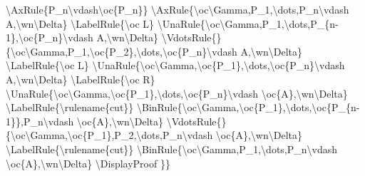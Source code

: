\textbackslash{}AxRule\{P\_n\textbackslash{}vdash\textbackslash{}oc\{P\_n\}\}
\textbackslash{}AxRule\{\textbackslash{}oc\textbackslash{}Gamma,P\_1,\textbackslash{}dots,P\_n\textbackslash{}vdash
A,\textbackslash{}wn\textbackslash{}Delta\}
\textbackslash{}LabelRule\{\textbackslash{}oc L\}
\textbackslash{}UnaRule\{\textbackslash{}oc\textbackslash{}Gamma,P\_1,\textbackslash{}dots,P\_\{n-1\},\textbackslash{}oc\{P\_n\}\textbackslash{}vdash
A,\textbackslash{}wn\textbackslash{}Delta\}
\textbackslash{}VdotsRule\{\}\{\textbackslash{}oc\textbackslash{}Gamma,P\_1,\textbackslash{}oc\{P\_2\},\textbackslash{}dots,\textbackslash{}oc\{P\_n\}\textbackslash{}vdash
A,\textbackslash{}wn\textbackslash{}Delta\}
\textbackslash{}LabelRule\{\textbackslash{}oc L\}
\textbackslash{}UnaRule\{\textbackslash{}oc\textbackslash{}Gamma,\textbackslash{}oc\{P\_1\},\textbackslash{}dots,\textbackslash{}oc\{P\_n\}\textbackslash{}vdash
A,\textbackslash{}wn\textbackslash{}Delta\}
\textbackslash{}LabelRule\{\textbackslash{}oc R\}
\textbackslash{}UnaRule\{\textbackslash{}oc\textbackslash{}Gamma,\textbackslash{}oc\{P\_1\},\textbackslash{}dots,\textbackslash{}oc\{P\_n\}\textbackslash{}vdash
\textbackslash{}oc\{A\},\textbackslash{}wn\textbackslash{}Delta\}
\textbackslash{}LabelRule\{\textbackslash{}rulename\{cut\}\}
\textbackslash{}BinRule\{\textbackslash{}oc\textbackslash{}Gamma,\textbackslash{}oc\{P\_1\},\textbackslash{}dots,\textbackslash{}oc\{P\_\{n-1\}\},P\_n\textbackslash{}vdash
\textbackslash{}oc\{A\},\textbackslash{}wn\textbackslash{}Delta\}
\textbackslash{}VdotsRule\{\}\{\textbackslash{}oc\textbackslash{}Gamma,\textbackslash{}oc\{P\_1\},P\_2,\textbackslash{}dots,P\_n\textbackslash{}vdash
\textbackslash{}oc\{A\},\textbackslash{}wn\textbackslash{}Delta\}
\textbackslash{}LabelRule\{\textbackslash{}rulename\{cut\}\}
\textbackslash{}BinRule\{\textbackslash{}oc\textbackslash{}Gamma,P\_1,\textbackslash{}dots,P\_n\textbackslash{}vdash
\textbackslash{}oc\{A\},\textbackslash{}wn\textbackslash{}Delta\}
\textbackslash{}DisplayProof \}\}


